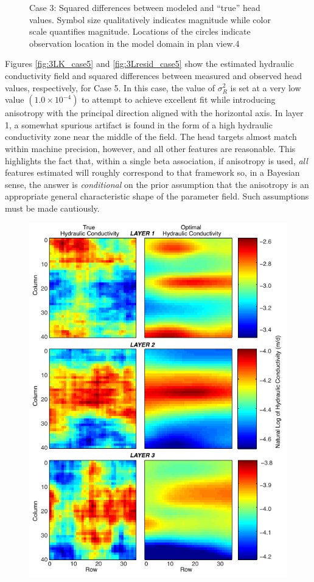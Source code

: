 \documentclass[11pt,oneside,onecolumn]{usgsreport}
\begin{document}
\begin{appendix}
\begin{figure}[H]
\caption{\label{fig:3Lresid_case3}Case 3: Squared differences between modeled
and ``true'' head values. Symbol size qualitatively indicates magnitude
while color scale quantifies magnitude. Locations of the circles indicate
observation location in the model domain in plan view.4}
\end{figure}


Figures \ref{fig:3LK_case5} and \ref{fig:3Lresid_case5} show the
estimated hydraulic conductivity field and squared differences between
measured and observed head values, respectively, for Case 5. In this
case, the value of $\sigma_{R}^{2}$ is set at a very low value $\left(1.0\times10^{-4}\right)$
to attempt to achieve excellent fit while introducing anisotropy with
the principal direction aligned with the horizontal axis. In layer
1, a somewhat spurious artifact is found in the form of a high hydraulic
conductivity zone near the middle of the field. The head targets almost
match within machine precision, however, and all other features are
reasonable. This highlights the fact that, within a single beta association,
if anisotropy is used, \emph{all }features estimated will roughly
correspond to that framework so, in a Bayesian sense, the answer is
\emph{conditional }on the prior assumption that the anisotropy is
an appropriate general characteristic shape of the parameter field.
Such assumptions must be made cautiously.

\begin{figure}[H]
\begin{center}\includegraphics{figures/3KL_case5}\end{center}


\end{figure}
\end{appendix}
\end{document}
